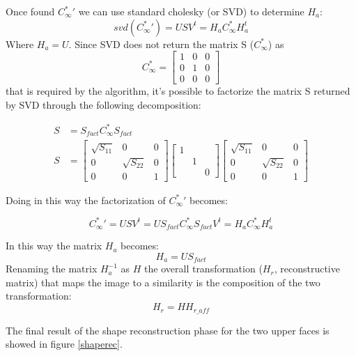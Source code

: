 \documentclass[11pt, oneside]{article}   	%
\begin{document}
Once found $C^*_{\infty}{'}$ we can use standard cholesky (or SVD) to determine $H_a$:
$$
svd(C^*_{\infty}{'}) = USV^{t} = H_a C^*_{\infty} H_a^t 
$$
Where $H_a = U$.
Since SVD does not return the matrix S ($C_{\infty}^*$) as 
$$C_{\infty}^* = \begin{bmatrix} 1 & 0 & 0 \\ 0 & 1 & 0 \\ 0  & 0 & 0\end{bmatrix} $$
that is required by the algorithm, it's possible to factorize the matrix S returned by SVD through the following decomposition:

\begin{subequations}
\begin{align*}
S & = S_{fact} C_{\infty}^* S_{fact} \\
S & = \begin{bmatrix} \sqrt{S_{11}} & 0& 0 \\ 0 & \sqrt{S_{22}}  & 0   \\ 0 & 0 & 1 \end{bmatrix} \begin{bmatrix} 1 && \\&1&\\&&0\end{bmatrix} \begin{bmatrix} \sqrt{S_{11}} & 0& 0 \\ 0 & \sqrt{S_{22}} & 0   \\ 0 & 0 & 1 \end{bmatrix} 
\end{align*}
\end{subequations}

Doing in this way the factorization of $C^*_{\infty}{'}$ becomes:

$$
C^*_{\infty}{'} = USV^{t} = U S_{fact} C_{\infty}^* S_{fact} V^{t} = H_a C^*_{\infty} H_a^t 
$$

In this way the matrix $H_a$ becomes:
$$
H_a = U S_{fact}
$$
Renaming the matrix $H_a^{-1}$ as $H$  the overall transformation ($H_r$, reconstructive matrix) that maps the image to a similarity is the composition of the two transformation:
$$
H_r = H H_{r\_aff} 
$$

The final result of the shape reconstruction phase for the two upper faces is showed in figure \ref{shaperec}.
\end{document}
